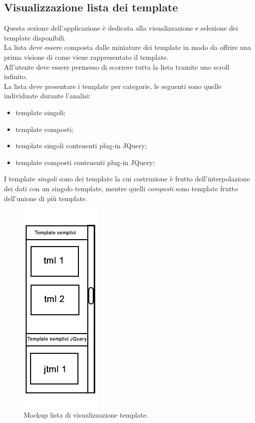 \subsection{Visualizzazione lista dei template}
Questa sezione dell'applicazione è dedicata alla visualizzazione e selezione dei template disponibili.\\
La lista deve essere composta dalle miniature dei template in modo da offrire una prima visione di come viene rappresentato il template.\\
All'utente deve essere permesso di scorrere tutta la lista tramite uno scroll infinito.\\
La lista deve presentare i template per categorie, le seguenti sono quelle individuate durante l'analisi:
\begin{itemize}
	\item template singoli;
	\item template composti;
	\item template singoli contenenti plug-in JQuery;
	\item template composti contenenti plug-in JQuery;
\end{itemize}
I template \textit{singoli} sono dei template la cui costruzione è frutto dell'interpolazione dei dati con un singolo template, mentre quelli \textit{composti} sono template frutto dell'unione di più template.\\
\begin{figure}[htp]
	\centering
	\includegraphics[scale=0.5]{../immagini/mockup_lista}
	\caption{Mockup lista di visualizzazione template.}
\end{figure}

